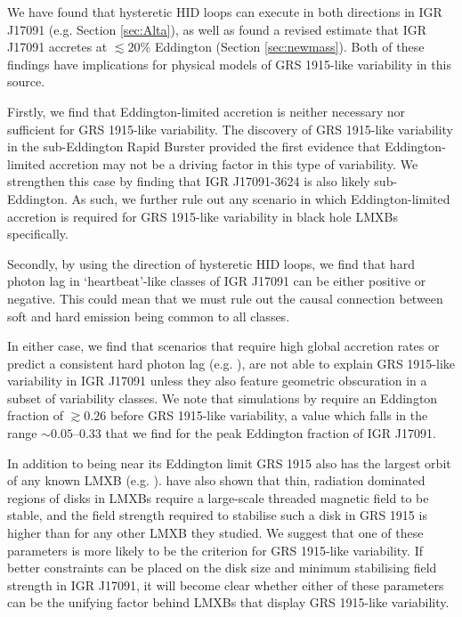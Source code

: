 \par We have found that hysteretic HID loops can execute in both directions in IGR J17091 (e.g. Section \ref{sec:Alta}), as well as found a revised estimate that IGR J17091 accretes at $\lesssim20$\% Eddington (Section \ref{sec:newmass}).  Both of these findings have implications for physical models of GRS 1915-like variability in this source.
\par Firstly, we find that Eddington-limited accretion is neither necessary nor sufficient for GRS 1915-like variability.  The discovery of GRS 1915-like variability in the sub-Eddington Rapid Burster \citep{Bagnoli_RB,Bagnoli_PopStudy} provided the first evidence that Eddington-limited accretion may not be a driving factor in this type of variability.  We strengthen this case by finding that IGR J17091-3624 is also likely sub-Eddington.  As such, we further rule out any scenario in which Eddington-limited accretion is required for GRS 1915-like variability in black hole LMXBs specifically.
\par Secondly, by using the direction of hysteretic HID loops, we find that hard photon lag in `heartbeat'-like classes of IGR J17091 can be either positive or negative.  This could mean that we must rule out the causal connection between soft and hard emission being common to all classes.
\par In either case, we find that scenarios that require high global accretion rates or predict a consistent hard photon lag (e.g. \citealp{Neilsen_GRSModel,Janiuk_Lag}), are not able to explain GRS 1915-like variability in IGR J17091 unless they also feature geometric obscuration in a subset of variability classes.  We note that simulations by \citealp{Nayakshin_GRSModel} require an Eddington fraction of $\gtrsim0.26$ before GRS 1915-like variability, a value which falls in the range $\sim0.05\mbox{--}0.33$ that we find for the peak Eddington fraction of IGR J17091.
\par In addition to being near its Eddington limit GRS 1915 also has the largest orbit of any known LMXB (e.g. \citealp{McClintock_BHBs}).  \citealp{Sadowski_MagField} have also shown that thin, radiation dominated regions of disks in LMXBs require a large-scale threaded magnetic field to be stable, and the field strength required to stabilise such a disk in GRS 1915 is higher than for any other LMXB they studied.  We suggest that one of these parameters is more likely to be the criterion for GRS 1915-like variability.  If better constraints can be placed on the disk size and minimum stabilising field strength in IGR J17091, it will become clear whether either of these parameters can be the unifying factor behind LMXBs that display GRS 1915-like variability.

